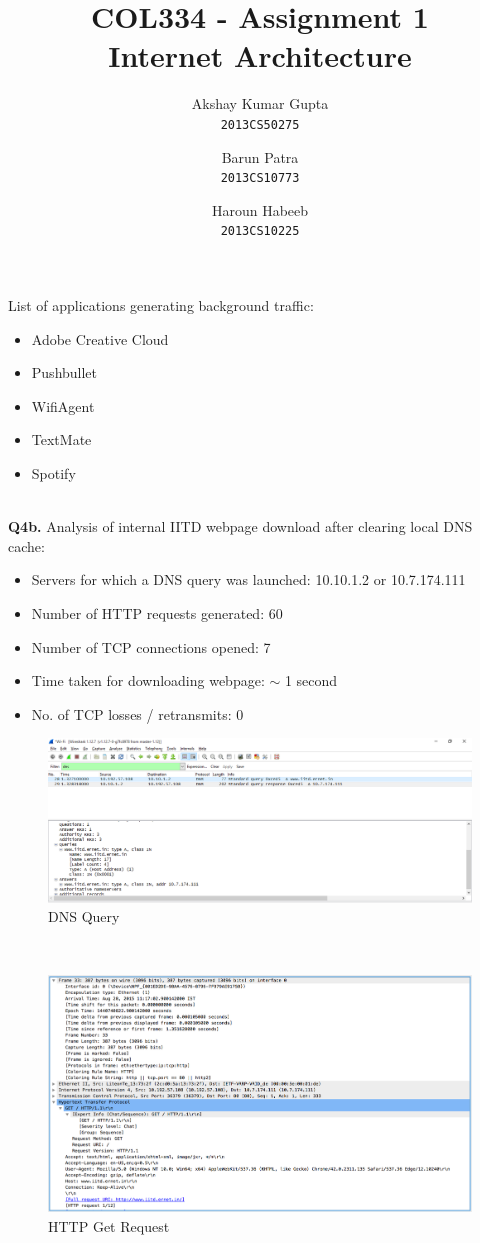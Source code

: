 \documentclass[12pt]{article}
\begin{document}
\title{COL334 - Assignment 1\\ Internet Architecture}
\author{Akshay Kumar Gupta\\\texttt{2013CS50275} \and  Barun Patra\\\texttt{2013CS10773} \and Haroun Habeeb\\\texttt{2013CS10225}}
\date{}
\maketitle
{} List of applications generating background traffic:
\begin{itemize}
\item Adobe Creative Cloud
\item Pushbullet
\item WifiAgent
\item TextMate
\item Spotify
\end{itemize}
~\\
{\bfseries Q4b.} Analysis of internal IITD webpage download after clearing local DNS cache:
\begin{itemize}
\item Servers for which a DNS query was launched: 10.10.1.2 or 10.7.174.111
\item Number of HTTP requests generated: 60 
\item Number of TCP connections opened: 7
\item Time taken for downloading webpage: $\sim$ 1 second
\item No. of TCP losses / retransmits: 0
\end{itemize}
\begin{figure}[h!]
\includegraphics[scale=0.38]{../Screenshots/dns-reply2.png}
\caption{DNS Query}
\end{figure}
~\\
\begin{figure}[h!]
\includegraphics[scale=0.38]{../Screenshots/http-get-request.png}
\caption{HTTP Get Request}
\end{figure}
\end{document}
